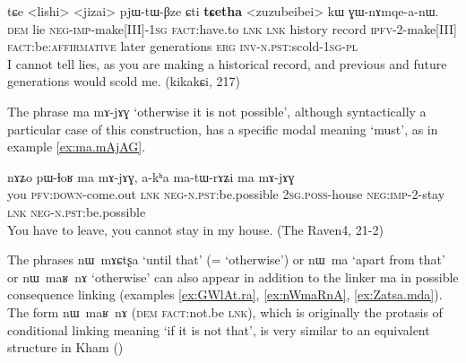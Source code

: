 \documentclass[oldfontcommands,oneside,a4paper,11pt]{article}
\newcommand{\ipa}[1]{{\phon \mbox{#1}}} %
\begin{document}
\begin{exe}
\ex \label{ex:matABzea}
\gll 
[\ipa{nɯ}    	\ipa{kʰramba}    	\ipa{ma-tɤ-βze-a}    	\ipa{ra}]    	\ipa{\textbf{ma}}    	\ipa{tɕe}    	<lishi>    	<jizai>    	\ipa{pjɯ-tɯ-βze}    	\ipa{ɕti}    	    	\ipa{\textbf{tɕetha}}    		     <zuzubeibei>    	\ipa{kɯ}    	\ipa{ɣɯ-nɤmqe-a-nɯ.}    \\
\textsc{dem}  lie \textsc{neg-imp}-make[III]-\textsc{1sg} \textsc{fact}:have.to \textsc{lnk} \textsc{lnk}   history record \textsc{ipfv}-2-make[III] \textsc{fact}:be:\textsc{affirmative} later generations \textsc{erg}  \textsc{inv-n.pst}:scold-\textsc{1sg-pl} \\
\glt I cannot tell lies, as   you are making a historical record, and previous and future generations would scold me.  (kikakɕi, 217)
 \end{exe}

The phrase \ipa{ma}  	\ipa{mɤ-jɤɣ} `otherwise it is not possible', although syntactically a particular case of this construction, has a specific modal meaning `must', as in example \ref{ex:ma.mAjAG}.


\begin{exe}
\ex \label{ex:ma.mAjAG}
\gll 
\ipa{nɤʑo}  	\ipa{pɯ-ɬoʁ}  	\ipa{ma}  	\ipa{mɤ-jɤɣ,}  	\ipa{a-kʰa}  	\ipa{ma-tɯ-rɤʑi}  	\ipa{ma}  	\ipa{mɤ-jɤɣ}  \\
you \textsc{pfv:down}-come.out \textsc{lnk} \textsc{neg-n.pst}:be.possible \textsc{2sg.poss}-house \textsc{neg:imp}-2-stay \textsc{lnk} \textsc{neg-n.pst}:be.possible \\
\glt You have to leave, you cannot stay in my house. (The Raven4, 21-2)
 \end{exe}


The phrases \ipa{nɯ mɤɕtʂa} `until that' (= `otherwise') or \ipa{nɯ ma} `apart from that' or \ipa{nɯ maʁ nɤ} `otherwise' can also appear in addition to the linker \ipa{ma} in possible consequence linking (examples \ref{ex:GWlAt.ra}, \ref{ex:nWmaRnA}, \ref{ex:Zatsa.mda}). The form \ipa{nɯ maʁ nɤ} (\textsc{dem} \textsc{fact}:not.be \textsc{lnk}), which is originally the protasis of conditional linking meaning `if it is not that', is very similar to an equivalent structure in Kham (\citealt[112]{watters09kham})
 
\end{document}

